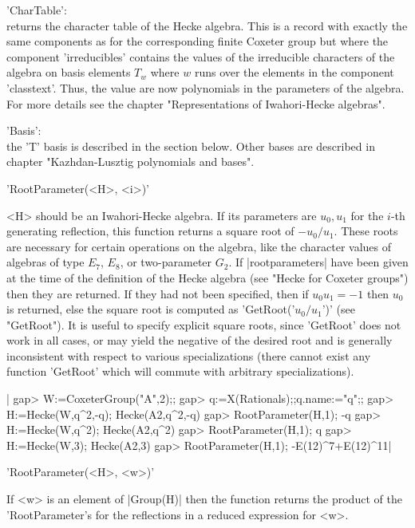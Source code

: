 'CharTable':\\ returns the character table  of the Hecke algebra. This is
     a record with  exactly the same  components as for the corresponding
     finite Coxeter group but where the component 'irreducibles' contains
     the values  of the irreducible characters   of the algebra  on basis
     elements $T_w$ where  $w$ runs  over  the elements in the  component
     'classtext'. Thus, the value  are now polynomials in the  parameters
     of the algebra.  For  more details see the  chapter "Representations
     of Iwahori-Hecke algebras".

'Basis':\\ the 'T' basis is described in  the section below.  Other bases
     are described in chapter "Kazhdan-Lusztig polynomials and bases".


'RootParameter(<H>, <i>)'

<H>  should be an  Iwahori-Hecke algebra. If  its parameters are $u_0, u_1$
for  the $i$-th generating reflection, this  function returns a square root
of  $-u_0/u_1$. These  roots are  necessary for  certain operations  on the
algebra,  like the  character values  of algebras  of type $E_7$, $E_8$, or
two-parameter $G_2$. If |rootparameters| have been given at the time of the
definition  of the Hecke algebra (see "Hecke for Coxeter groups") then they
are  returned. If  they had  not been  specified, then  if $u_0u_1=-1$ then
$u_0$ is returned, else the square root is computed as
'GetRoot('$u_0/u_1$')'  (see "GetRoot").  It is  useful to specify explicit
square  roots, since 'GetRoot' does not work in all cases, or may yield the
negative  of the desired root and is generally inconsistent with respect to
various  specializations (there  cannot exist  any function 'GetRoot' which
will commute with arbitrary specializations).

|    gap> W:=CoxeterGroup("A",2);;      
    gap> q:=X(Rationals);;q.name:="q";;
    gap> H:=Hecke(W,q^2,-q);
    Hecke(A2,q^2,-q)
    gap> RootParameter(H,1);
    -q
    gap> H:=Hecke(W,q^2);
    Hecke(A2,q^2)
    gap> RootParameter(H,1);
    q
    gap> H:=Hecke(W,3);
    Hecke(A2,3)
    gap> RootParameter(H,1);
    -E(12)^7+E(12)^11|

'RootParameter(<H>, <w>)'

If <w> is an element of |Group(H)| then the function returns the product of
the 'RootParameter's for the reflections in a reduced expression for <w>.


